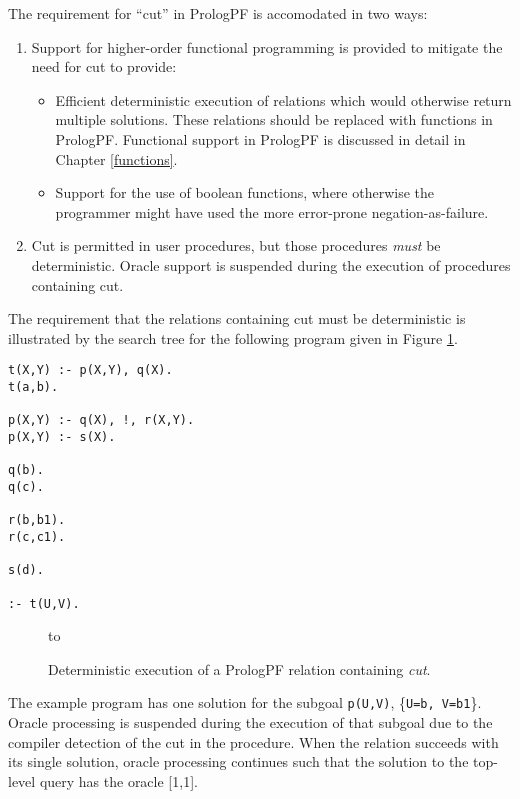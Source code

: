 The requirement for ``cut'' in PrologPF is accomodated in two ways:
\begin{enumerate}
\item{Support for higher-order functional programming is provided to mitigate the need for
  cut to provide:
  \begin{itemize}
  \item{Efficient deterministic execution of relations which would otherwise return
    multiple solutions.
    These relations should be replaced with functions in PrologPF.  Functional support in
    PrologPF is discussed in detail in Chapter \ref{functions}.}
  \item{Support for the use of boolean functions, where otherwise the programmer might have
    used the more error-prone negation-as-failure.}
  \end{itemize}}
\item{Cut is permitted in user procedures, but those procedures \textit{must} be deterministic.
  Oracle support is suspended during the execution of procedures containing cut.}
\end{enumerate}

The requirement that the relations containing cut must be deterministic is illustrated by
the search tree for the following program given in Figure \ref{cut_det_tree}.
\begin{verbatim}
t(X,Y) :- p(X,Y), q(X).
t(a,b).

p(X,Y) :- q(X), !, r(X,Y).
p(X,Y) :- s(X).

q(b).
q(c).

r(b,b1).
r(c,c1).

s(d).

:- t(U,V).
\end{verbatim}

\begin{figure}[htbp]
\vspace{5mm} \hbox to 
\caption{Deterministic execution of a PrologPF relation containing \textit{cut}.}
\vspace{5mm}
\label{cut_det_tree}
\end{figure}

The example program has one solution for the subgoal \texttt{p(U,V)}, \{\texttt{U=b, V=b1}\}.
Oracle processing is suspended during the execution of that subgoal due to the compiler
detection of the cut in the procedure.  When the relation succeeds with its single solution,
oracle processing continues such that the solution to the top-level query has the
oracle [1,1].

